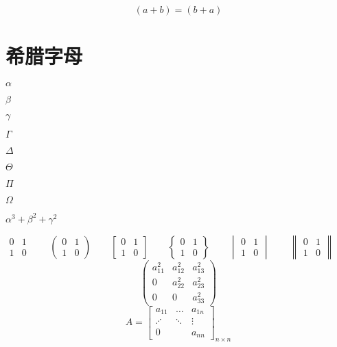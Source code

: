 \documentclass{ctexart}
\begin{document}
	\begin{equation}
		(a+b)=(b+a)
	\end{equation}
	\section{希腊字母}
	$\alpha$
	
	
	$\beta$
	
	$\gamma$
	
	$\Gamma$
	
	$\Delta$
	
	$\Theta$
	
	$\Pi$
	
	$\Omega$
	
	$\alpha^3+\beta^2+\gamma^2$
	
	\[
	\begin{matrix}
		0 & 1\\
		1 & 0
	\end{matrix} \qquad
	\begin{pmatrix}
		0 & 1\\
		1 & 0
	\end{pmatrix} \qquad
	\begin{bmatrix}
		0 & 1\\
		1 & 0
	\end{bmatrix} \qquad
	\begin{Bmatrix}
	0 & 1\\
	1 & 0
	\end{Bmatrix} \qquad
	\begin{vmatrix}
	0 & 1\\
	1 & 0
	\end{vmatrix} \qquad
	\begin{Vmatrix}
	0 & 1\\
	1 & 0
	\end{Vmatrix} \qquad
	\]
	\[
	\begin{pmatrix}
		a_{11}^2 & a_{12}^2 & a_{13}^2\\
		0 & a_{22}^2 & a_{23}^2 \\
		0 & 0 & a_{33}^2
	\end{pmatrix}
	\]
	\[
		A=\begin{bmatrix}
			a_{11} & \dots & a_{1n} \\
			\iddots & \ddots & \vdots \\
			0 & & a_{nn}
		\end{bmatrix}_{n \times n}
	\]
	
\end{document}
